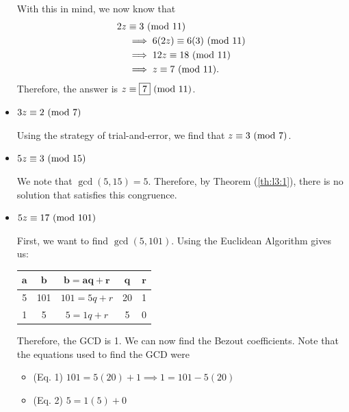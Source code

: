 \documentclass[letterpaper]{article}
\begin{document}
\begin{mdframed}
\begin{itemize}
\begin{mdframed}
            \bigskip 

            With this in mind, we now know that 
            \begin{equation*}
                \begin{aligned}
                    2z &\equiv 3 \ (\mathrm{mod}\ 11) \\ 
                        &\implies 6(2z) \equiv 6(3) \ (\mathrm{mod}\ 11) \\ 
                        &\implies 12z \equiv 18 \ (\mathrm{mod}\ 11) \\ 
                        &\implies z \equiv 7 \ (\mathrm{mod}\ 11).
                \end{aligned}
            \end{equation*}
            Therefore, the answer is $z \equiv \boxed{7} \ (\mathrm{mod}\ 11)$.
        \end{mdframed}
        
        \item $3z \equiv 2 \ (\mathrm{mod}\ 7)$
        \begin{mdframed}
            Using the strategy of trial-and-error, we find that $z \equiv 3 \ (\mathrm{mod}\ 7)$. 
        \end{mdframed}
        
        \item $5z \equiv 3 \ (\mathrm{mod}\ 15)$
        \begin{mdframed}
            We note that $\gcd(5, 15) = 5$. Therefore, by Theorem (\ref{th:l3:1}), there is no solution that satisfies this congruence.
        \end{mdframed}

        \item $5z \equiv 17 \ (\mathrm{mod}\ 101)$
        \begin{mdframed}
            First, we want to find $\gcd(5, 101)$. Using the Euclidean Algorithm gives us:
            \begin{center}
                \begin{tabular}{|c|c|c|c|c|}
                    \hline 
                    $\mathbf{a}$ & $\mathbf{b}$ & $\mathbf{b = aq + r}$ & $\mathbf{q}$ & $\mathbf{r}$ \\ 
                    \hline 
                    5 & 101 & $101 = 5q + r$ & 20 & 1 \\ 
                    1 & 5 & $5 = 1q + r$ & 5 & 0 \\ 
                    \hline 
                \end{tabular}
            \end{center}
            Therefore, the GCD is 1. We can now find the Bezout coefficients. Note that the equations used to find the GCD were 
            \begin{itemize}
                \item (Eq. 1) $101 = 5(20) + 1 \implies 1 = 101 - 5(20)$
                \item (Eq. 2) $5 = 1(5) + 0$
            \end{itemize}
            

\end{mdframed}
\end{itemize}
\end{mdframed}
\end{document}
